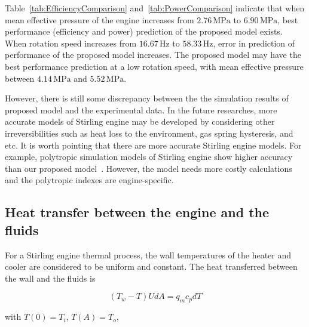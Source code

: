 Table~\ref{tab:EfficiencyComparison} and~\ref{tab:PowerComparison} indicate that when mean effective pressure of the engine increases from $2.76\,\mathrm{MPa}$ to $6.90\,\mathrm{MPa}$, best performance (efficiency and power) prediction of the proposed model exists. When rotation speed increases from $16.67\,\mathrm{Hz}$ to $58.33\,\mathrm{Hz}$, error in prediction of performance of the proposed model increases. The proposed model may have the best performance prediction at a low rotation speed, with mean effective pressure between $4.14\,\mathrm{MPa}$ and $5.52\,\mathrm{MPa}$.

However, there is still some discrepancy between the the simulation results of proposed model and the experimental data. In the future researches, more accurate models of Stirling engine may be developed by considering other irreversibilities such as heat loss to the environment, gas spring hysteresis, and etc. It is worth pointing that there are more accurate Stirling engine models. For example, polytropic simulation models of Stirling engine show higher accuracy than our proposed model~\cite{Hosseinzade2015, Babaelahi2015}. However, the model needs more costly calculations and the polytropic indexes are engine-specific.

\subsection{Heat transfer between the engine and the fluids}

For a Stirling engine thermal process, the wall temperatures of the heater and cooler are considered to be uniform and constant. The heat transferred between the wall and the fluids is

\begin{equation}
	(T_w-T)UdA = q_mc_pdT
\end{equation}

with $T(0)=T_i$, $T(A)=T_o$,

